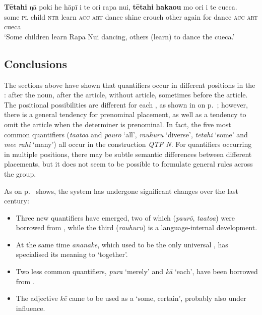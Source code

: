 \ea\label{ex:4.124}
\gll \textbf{Tētahi} ŋā poki he hāpī i te {\ꞌ}ori rapa nui, \textbf{tētahi} \textbf{haka{\ꞌ}ou} mo {\ꞌ}ori  i te cueca.\\
some \textsc{pl} child \textsc{ntr} learn \textsc{acc} \textsc{art} dance shine crouch other again for dance  \textsc{acc} \textsc{art} cueca\\

\glt 
‘Some children learn Rapa Nui dancing, others (learn) to dance the cueca.’ \textstyleExampleref{[R334.131]} 
\z

\subsection{Conclusions}\label{sec:4.4.11}

The sections above have shown that quantifiers occur in different positions in the : after the noun, after the article, without article, sometimes before the article. The positional possibilities are different for each , as shown in  on p.~\pageref{tab:30}; however, there is a general tendency for prenominal placement, as well as a tendency to omit the article when the determiner is prenominal. In fact, the five most common quantifiers (\textit{ta{\ꞌ}ato{\ꞌ}a} and \textit{paurō} ‘all’, \textit{rauhuru} ‘diverse’, \textit{tētahi} ‘some’ and \textit{me{\ꞌ}e rahi} ‘many’) all occur in the construction \textit{QTF N}. For quantifiers occurring in multiple positions, there may be subtle semantic differences between different placements, but it does not seem to be possible to formulate general rules across the group. 

As  on p.~\pageref{tab:28} shows, the  system has undergone significant changes over the last century: 

\begin{itemize}
\item 
Three new quantifiers have emerged, two of which (\textit{paurō}, \textit{ta{\ꞌ}ato{\ꞌ}a}) were borrowed from , while the third (\textit{rauhuru}) is a language-internal development. 

\item 
At the same time \textit{ananake}, which used to be the only universal , has specialised its meaning to ‘together’. 

\item 
Two less common quantifiers, \textit{pura} ‘merely’ and \textit{kā} ‘each’, have been borrowed from . 

\item 
The adjective \textit{kē} came to be used as a  ‘some, certain’, probably also under  influence.

\end{itemize}

